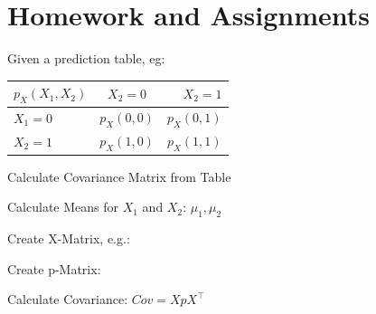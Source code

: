 \documentclass[english]{latex4ei/latex4ei_sheet}
\begin{document}
\section{Homework and Assignments}
Given a prediction table, eg:
\begin{tabular}{l|c|r}
    $p_X(X_1,X_2)$& $X_2=0$ & $X_2=1$ \\
    \hline
     $X_1=0$& $p_X(0,0)$& $p_X(0,1)$ \\
     \hline
     $X_2=1$& $p_X(1,0)$& $p_X(1,1)$
\end{tabular}
    \begin{cookbox}{Calculate Covariance Matrix from Table}
            \item Calculate Means for $X_1$ and $X_2$: $\mu_1, \mu_2$
            \item Create X-Matrix, e.g.: 
            \item Create p-Matrix: 
            \item Calculate Covariance: $Cov=XpX^{\top}$
    \end{cookbox}
\end{document}

